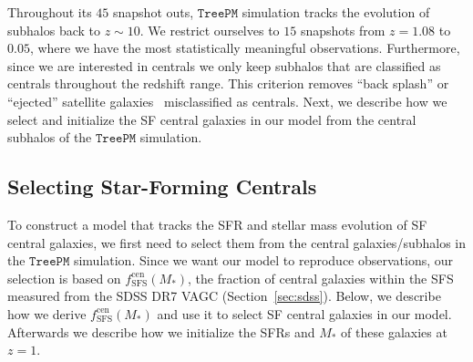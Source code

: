 \documentclass[12pt, letterpaper, preprint, tighten]{aastex62}
\begin{document}
Throughout its $45$ snapshot outs, $\mathtt{TreePM}$ simulation tracks
the evolution of subhalos back to $z \sim 10$. We restrict ourselves to $15$
snapshots from $z = 1.08$ to $0.05$, where we have the most statistically
meaningful observations. Furthermore, since we are interested in centrals we only
keep subhalos that are classified as centrals throughout the redshift
range. This criterion removes ``back splash'' or ``ejected'' satellite
galaxies~\citep[\emph{e.g.}][]{mamon2004,wetzel2014} misclassified as
centrals. Next, we describe how we select and initialize the SF central
galaxies in our model from the central subhalos of the $\mathtt{TreePM}$
simulation.

\subsection{Selecting Star-Forming Centrals}  \label{sec:sfcen}
To construct a model that tracks the SFR and stellar mass evolution of
SF central galaxies, we first need to select them from the
central galaxies/subhalos in the $\mathtt{TreePM}$ simulation. Since
we want our model to reproduce observations, our selection is based
on $f^\mathrm{cen}_\mathrm{SFS}(M_*)$, the fraction of central galaxies
within the SFS measured from the SDSS DR7 VAGC (Section~\ref{sec:sdss}).
Below, we describe how we derive $f^\mathrm{cen}_\mathrm{SFS}(M_*)$ and
use it to select SF central galaxies in our model. Afterwards
we describe how we initialize the SFRs and $M_*$ of these galaxies at
$z = 1$.
\end{document}

